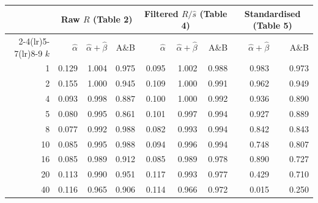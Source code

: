 \begin{tabular}{rrrrrrrrr}
\toprule
 & \multicolumn{3}{c}{Raw $R$ (Table 2)} & \multicolumn{3}{c}{Filtered $R/\hat s$ (Table 4)} & \multicolumn{2}{c}{Standardised (Table 5)} \\
\cmidrule(lr){2-4}\cmidrule(lr){5-7}\cmidrule(lr){8-9}
$k$ & $\hat\alpha$ & $\hat\alpha+\hat\beta$ & A\&B & $\hat\alpha$ & $\hat\alpha+\hat\beta$ & A\&B & $\hat\alpha+\hat\beta$ & A\&B \\
\midrule
1 & 0.129 & 1.004 & 0.975 & 0.095 & 1.002 & 0.988 & 0.983 & 0.973 \\
2 & 0.155 & 1.000 & 0.945 & 0.109 & 1.000 & 0.991 & 0.962 & 0.949 \\
4 & 0.093 & 0.998 & 0.887 & 0.100 & 1.000 & 0.992 & 0.936 & 0.890 \\
5 & 0.080 & 0.995 & 0.861 & 0.101 & 0.997 & 0.994 & 0.927 & 0.889 \\
8 & 0.077 & 0.992 & 0.988 & 0.082 & 0.993 & 0.994 & 0.842 & 0.843 \\
10 & 0.085 & 0.995 & 0.988 & 0.094 & 0.996 & 0.994 & 0.748 & 0.807 \\
16 & 0.085 & 0.989 & 0.912 & 0.085 & 0.989 & 0.978 & 0.890 & 0.727 \\
20 & 0.113 & 0.990 & 0.951 & 0.117 & 0.993 & 0.977 & 0.429 & 0.710 \\
40 & 0.116 & 0.965 & 0.906 & 0.114 & 0.966 & 0.972 & 0.015 & 0.250 \\
\bottomrule
\end{tabular}